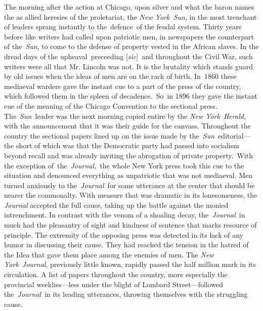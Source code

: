 \documentclass[twoside,symmetric,nobib,justified]{tufte-book}
\begin{document}
The morning after the action at Chicago, upon silver and what the baron
names the as allied heresies of the proletariat, the \emph{New
York~Sun}, in the most trenchant of leaders sprang instantly to
the~defence~of the feudal system. Thirty years before like writers had
called upon patriotic men, in newspapers the counterpart of
the~\emph{Sun}, to come to the defense of property vested in the African
slaves. In the dread days of the upheaval~preceeding
{[}\emph{sic}{]}~and throughout the Civil War, such writers were all
that Mr. Lincoln was not. It is the brutality which stands guard by old
issues when the ideas of men are on the rack of birth. In~1860 these
mediaeval warders gave the instant cue to a part of the press of the
country, which followed them in the spleen of decadence.~So~in 1896 they
gave the instant cue of the meaning of the Chicago Convention to the
sectional press. The~\emph{Sun~}leader was the next morning copied
entire by the \emph{New York}~\emph{Herald}, with the announcement that
it was their guide for the canvass. Throughout the country the sectional
papers lined up on the issue made by the~\emph{Sun}~editorial---the
short of which was that the Democratic party had passed into socialism
beyond recall and was already inviting the abrogation of private
property.~With the exception of~the~\emph{Journal,}~the whole New York
press took this cue to the situation and denounced everything as
unpatriotic that was not mediaeval. Men turned anxiously to
the~\emph{Journal}~for some utterance at the center that should be
nearer the commonalty. With measure that was dramatic in its
lonesomeness, the \emph{Journal} accepted the full cause, taking up the
battle against the monied intrenchment. In contrast with the venom of a
shoaling decay, the~\emph{Journal}~in much had the pleasantry of sight
and kindness of sentence that marks resource of principle. The extremity
of the opposing press was detected in its lack of any humor in
discussing their cause. They had reached the tension in the hatred of
the Idea that gave them place among the enemies of men. The \emph{New
York}~\emph{Journal}, previously little known, rapidly passed the half
million mark in its circulation. A list of papers throughout the
country, more especially the provincial weeklies---less under the blight
of Lombard Street---followed the\emph{~Journal}~in its leading
utterances, throwing themselves with the struggling cause.~
\end{document}
